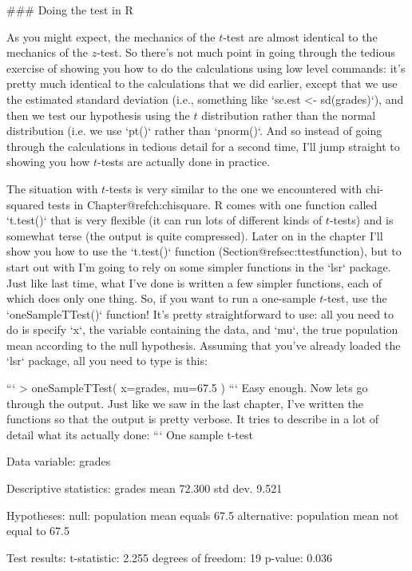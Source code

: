 ### Doing the test in R

As you might expect, the mechanics of the $t$-test are almost identical to the mechanics of the $z$-test. So there's not much point in going through the tedious exercise of showing you how to do the calculations using low level commands: it's pretty much identical to the calculations that we did earlier, except that we use the estimated standard deviation (i.e., something like `se.est <- sd(grades)`), and then we test our hypothesis using the $t$ distribution rather than the normal distribution  (i.e. we use `pt()` rather than `pnorm()`. And so instead of going through the calculations in tedious detail for a second time, I'll jump straight to showing you how $t$-tests are actually done in practice. 

The situation with $t$-tests is very similar to the one we encountered with chi-squared tests in Chapter@refch:chisquare. R comes with one function called `t.test()` that is very flexible (it can run lots of different kinds of $t$-tests) and is somewhat terse (the output is quite compressed). Later on in the chapter I'll show you how to use the `t.test()` function (Section@refsec:ttestfunction), but to start out with I'm going to rely on some simpler functions in the `lsr` package. Just like last time, what I've done is written a few simpler functions, each of which does only one thing. So, if you want to run a one-sample $t$-test, use the `oneSampleTTest()` function! It's pretty straightforward to use: all you need to do is specify `x`, the variable containing the data, and `mu`, the true population mean according to the null hypothesis. Assuming that you've already loaded the `lsr` package, all you need to type is this:

```
> oneSampleTTest( x=grades, mu=67.5 )
```
Easy enough. Now lets go through the output. Just like we saw in the last chapter, I've written the functions so that the output is pretty verbose. It tries to describe in a lot of detail what its actually done:
```
   One sample t-test 

Data variable:   grades 

Descriptive statistics: 
            grades
   mean     72.300
   std dev.  9.521

Hypotheses: 
   null:        population mean equals 67.5 
   alternative: population mean not equal to 67.5 

Test results: 
   t-statistic:  2.255 
   degrees of freedom:  19 
   p-value:  0.036 

